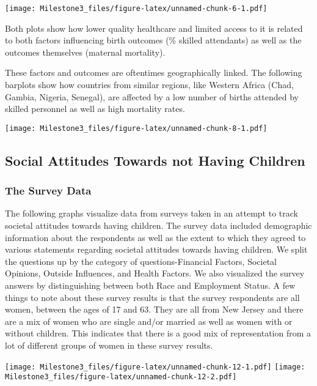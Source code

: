 \documentclass[
]{article}
\begin{document}
\texttt{[image: Milestone3\_files/figure-latex/unnamed-chunk-6-1.pdf]}

Both plots show how lower quality healthcare and limited access to it is
related to both factors influencing birth outcomes (\% skilled
attendants) as well as the outcomes themselves (maternal mortality).

These factors and outcomes are oftentimes geographically linked. The
following barplots show how countries from similar regions, like Western
Africa (Chad, Gambia, Nigeria, Senegal), are affected by a low number of
births attended by skilled personnel as well as high mortality rates.

\bigskip
\bigskip

\texttt{[image: Milestone3\_files/figure-latex/unnamed-chunk-8-1.pdf]}

\hypertarget{social-attitudes-towards-not-having-children}{%
\subsection{Social Attitudes Towards not Having
Children}\label{social-attitudes-towards-not-having-children}}

\hypertarget{the-survey-data}{%
\subsubsection{The Survey Data}\label{the-survey-data}}

The following graphs visualize data from surveys taken in an attempt to
track societal attitudes towards having children. The survey data
included demographic information about the respondents as well as the
extent to which they agreed to various statements regarding societal
attitudes towards having children. We split the questions up by the
category of questions-Financial Factors, Societal Opinions, Outside
Influences, and Health Factors. We also visualized the survey answers by
distinguishing between both Race and Employment Status. A few things to
note about these survey results is that the survey respondents are all
women, between the ages of 17 and 63. They are all from New Jersey and
there are a mix of women who are single and/or married as well as women
with or without children. This indicates that there is a good mix of
representation from a lot of different groups of women in these survey
results.

\texttt{[image: Milestone3\_files/figure-latex/unnamed-chunk-12-1.pdf]}
\texttt{[image: Milestone3\_files/figure-latex/unnamed-chunk-12-2.pdf]}
\end{document}
